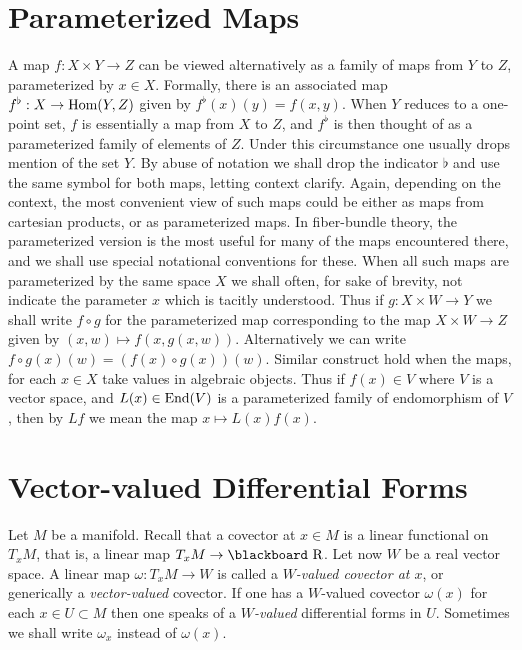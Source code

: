 \documentclass[12pt,titlepage]{article}
\def\bbf#1{\hbox{\blackboard #1}}
\def\lR{\bbf R}
\def\End{\hbox{End}}
\def\Hom{\hbox{Hom}}
\begin{document}
\section{Parameterized Maps}%
\label{sec:parmaps}%
A map \(f:X\times Y\to Z\) can be viewed alternatively as a family of
maps from \(Y\) to \(Z\), parameterized by \(x\in X\). Formally, there
is an associated map \(f^\flat: X\to \Hom(Y,Z)\) given by
\(f^\flat(x)(y)=f(x,y)\).  When \(Y\) reduces to a one-point set,
\(f\) is essentially a map from \(X\) to \(Z\), and \(f^\flat\) is then
thought of as a parameterized family of elements of \(Z\). Under this
circumstance one usually drops mention of the set \(Y\).
By abuse of notation we shall drop the indicator
\(\flat\) and use the same symbol for both maps, letting context clarify.
Again, depending on the context, the most convenient
 view of such maps could be
either as maps from cartesian products, or as parameterized maps. In
fiber-bundle theory, the parameterized version is the most useful for
many of the maps encountered there, and we shall use special notational
conventions for these.
When all such maps are parameterized by the same space \(X\) we
shall  often, for sake of brevity, not indicate the parameter \(x\)
which is tacitly understood. Thus if \(g:X\times W \to Y\) we shall
write \(f\circ g\) for the parameterized map 
corresponding to the map  \(X\times W \to Z\) given
by \((x,w) \mapsto f(x,g(x,w))\). Alternatively we can write \(f\circ
g(x)(w)=(f(x)\circ g(x))(w)\). Similar construct hold when the maps, for
each \(x\in X\) take values in algebraic objects. Thus if \(f(x)\in V\)
where \(V\) is a vector space, and \(L(x)\in \End(V)\) is a
parameterized family of endomorphism of \(V\), then by \(Lf\) we mean
the map \(x\mapsto L(x)f(x)\).

\section{Vector-valued Differential Forms}\label{sec:vvdf}%
Let \(M\) be a manifold. Recall that a covector at \(x\in M\)
is a linear functional on \(T_xM\), that is, a linear map \(T_xM \to
\lR\). Let now \(W\) be a real vector space. A linear map \(\omega:T_xM
\to W\) is called a {\em \(W\)-valued covector at \(x\)\/}, or
generically a {\em vector-valued\/}
%
covector. If one has a
\(W\)-valued covector \(\omega(x)\) for each \(x\in U\subset
M\)  then one speaks of a {\em \(W\)-valued\/} differential
forms in \(U\). Sometimes we shall write \(\omega_x\) instead of
\(\omega(x)\).
\end{document}
